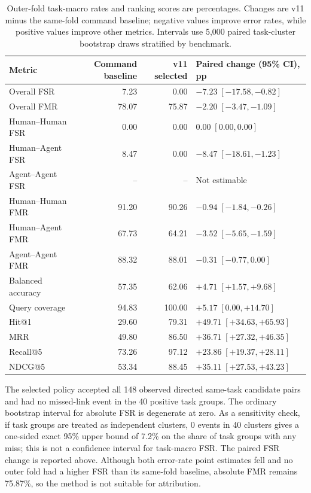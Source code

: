 \begin{table}[tb]
\centering
\small
\setlength{\tabcolsep}{4pt}
\begin{tabularx}{\linewidth}{l r r X}
\toprule
Metric & Command baseline & v11 selected & Paired change (95\% CI), pp \\
\midrule
Overall FSR & 7.23 & 0.00 & $-7.23\;[-17.58,-0.82]$ \\
Overall FMR & 78.07 & 75.87 & $-2.20\;[-3.47,-1.09]$ \\
Human--Human FSR & 0.00 & 0.00 & $0.00\;[0.00,0.00]$ \\
Human--Agent FSR & 8.47 & 0.00 & $-8.47\;[-18.61,-1.23]$ \\
Agent--Agent FSR & -- & -- & Not estimable \\
Human--Human FMR & 91.20 & 90.26 & $-0.94\;[-1.84,-0.26]$ \\
Human--Agent FMR & 67.73 & 64.21 & $-3.52\;[-5.65,-1.59]$ \\
Agent--Agent FMR & 88.32 & 88.01 & $-0.31\;[-0.77,0.00]$ \\
Balanced accuracy & 57.35 & 62.06 & $+4.71\;[+1.57,+9.68]$ \\
Query coverage & 94.83 & 100.00 & $+5.17\;[0.00,+14.70]$ \\
Hit@1 & 29.60 & 79.31 & $+49.71\;[+34.63,+65.93]$ \\
MRR & 49.80 & 86.50 & $+36.71\;[+27.32,+46.35]$ \\
Recall@5 & 73.26 & 97.12 & $+23.86\;[+19.37,+28.11]$ \\
NDCG@5 & 53.34 & 88.45 & $+35.11\;[+27.53,+43.23]$ \\
\bottomrule
\end{tabularx}
\caption{Outer-fold task-macro rates and ranking scores are percentages. Changes are v11 minus the same-fold command baseline; negative values improve error rates, while positive values improve other metrics. Intervals use 5,000 paired task-cluster bootstrap draws stratified by benchmark.}
\label{tab:balanced-innovation-v11}
\end{table}

The selected policy accepted all 148 observed directed same-task candidate pairs and had no missed-link event in the 40 positive task groups. The ordinary bootstrap interval for absolute FSR is degenerate at zero. As a sensitivity check, if task groups are treated as independent clusters, 0 events in 40 clusters gives a one-sided exact 95\% upper bound of 7.2\% on the share of task groups with any miss; this is not a confidence interval for task-macro FSR. The paired FSR change is reported above. Although both error-rate point estimates fell and no outer fold had a higher FSR than its same-fold baseline, absolute FMR remains 75.87\%, so the method is not suitable for attribution.

